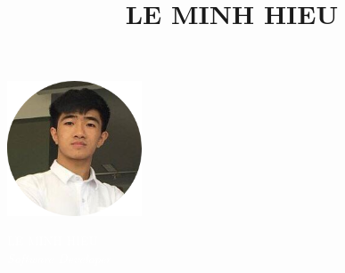 \documentclass[11pt,oneside,a4paper]{article}
\title{LE MINH HIEU}
\date{}
\begin{document}

\begin{tcolorbox}
    \begin{minipage}{4.5cm}
        \hspace*{-0.3cm}\includegraphics[width=4cm]{profile-modified.png}
    \end{minipage}
    \begin{minipage}{15cm}
        \begin{center}
            \Huge{\textcolor{white}{LE MINH HIEU}} \\
            \vspace*{0.5cm}
            \Large{\textcolor{white}{\textit{Software Developer}}}
        \end{center}
    \end{minipage}
\end{tcolorbox}
\end{document}
